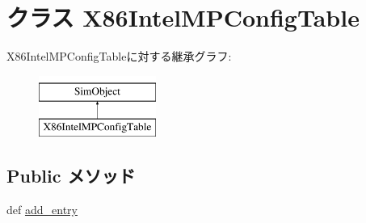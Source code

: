 \hypertarget{classIntelMP_1_1X86IntelMPConfigTable}{
\section{クラス X86IntelMPConfigTable}
\label{classIntelMP_1_1X86IntelMPConfigTable}
}
X86IntelMPConfigTableに対する継承グラフ:\begin{figure}[H]
\begin{center}
\leavevmode
\includegraphics[height=2cm]{classIntelMP_1_1X86IntelMPConfigTable}
\end{center}
\end{figure}
\subsection*{Public メソッド}
\begin{DoxyCompactItemize}
\item 
def \hyperlink{classIntelMP_1_1X86IntelMPConfigTable_a17fa36c4d45882f7ccc656751b78f937}{add\_\-entry}
\end{DoxyCompactItemize}
